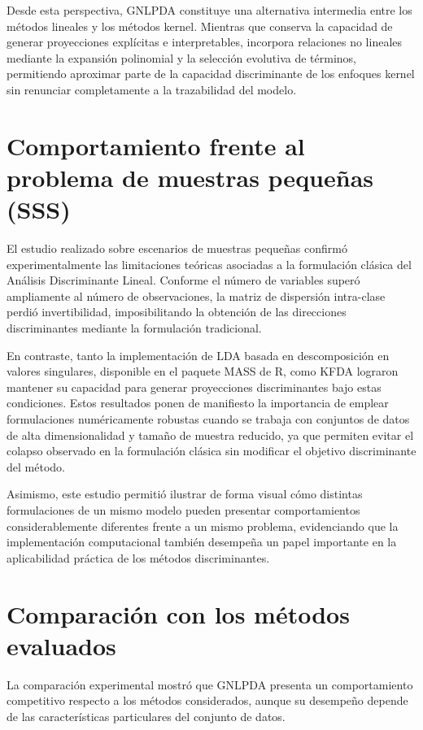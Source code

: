 Desde esta perspectiva, GNLPDA constituye una alternativa intermedia entre los métodos lineales y los métodos kernel. Mientras que conserva la capacidad de generar proyecciones explícitas e interpretables, incorpora relaciones no lineales mediante la expansión polinomial y la selección evolutiva de términos, permitiendo aproximar parte de la capacidad discriminante de los enfoques kernel sin renunciar completamente a la trazabilidad del
modelo.

\section{Comportamiento frente al problema de muestras pequeñas (SSS)}

El estudio realizado sobre escenarios de muestras pequeñas confirmó experimentalmente las limitaciones teóricas asociadas a la formulación clásica del Análisis Discriminante Lineal.
Conforme el número de variables superó ampliamente al número de observaciones, la matriz de dispersión intra-clase perdió invertibilidad, imposibilitando la obtención de las direcciones discriminantes mediante la formulación tradicional.

En contraste, tanto la implementación de LDA basada en descomposición en valores singulares, disponible en el paquete MASS de R, como KFDA lograron mantener su capacidad para generar proyecciones discriminantes bajo estas condiciones. Estos resultados ponen de manifiesto la importancia de emplear formulaciones numéricamente robustas cuando se trabaja con conjuntos de datos de alta dimensionalidad y tamaño de muestra reducido, ya que permiten evitar el colapso observado en la formulación clásica sin modificar el objetivo discriminante del método.

Asimismo, este estudio permitió ilustrar de forma visual cómo distintas formulaciones de un mismo modelo pueden presentar comportamientos considerablemente diferentes frente a un mismo problema, evidenciando que la implementación computacional también desempeña un papel importante en la aplicabilidad práctica de los métodos discriminantes.

\section{Comparación con los métodos evaluados}

La comparación experimental mostró que GNLPDA presenta un comportamiento competitivo respecto a los métodos considerados, aunque su desempeño depende de las características particulares del conjunto de datos.

